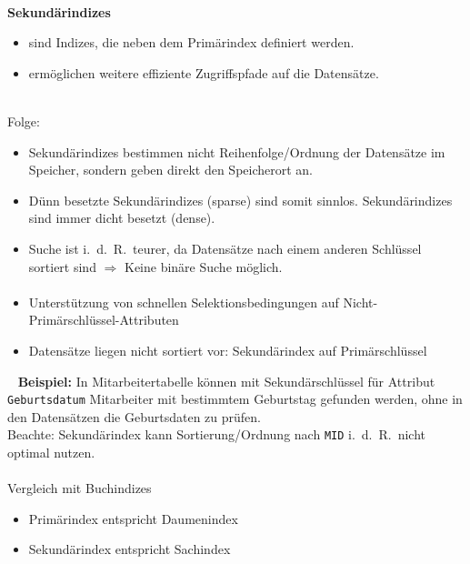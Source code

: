 \begin{frame}{\insertsection}
\framesubtitle{\insertsubsection}	
\abs
\textbf{Sekund\"arindizes}
\begin{itemize}
	\item sind Indizes, die neben dem Prim\"arindex definiert werden.\\[4pt] 
	\item erm\"oglichen weitere effiziente Zugriffspfade auf die Datens\"atze.
\end{itemize}
\pause
\ \\[4pt]
Folge:
\begin{itemize}
	\item Sekund\"arindizes bestimmen nicht Reihenfolge/Ordnung der Datens\"atze im Speicher, sondern geben direkt den Speicherort an.
	\item D\"unn besetzte Sekund\"arindizes (sparse) sind somit sinnlos. Sekund\"arindizes sind immer dicht besetzt (dense).
	\item Suche ist i.~d.~R.~teurer, da Datens\"atze nach einem anderen Schl\"ussel sortiert sind $\Rightarrow$ Keine bin\"are Suche m\"oglich.
\end{itemize}
\end{frame}

\begin{frame}{\insertsection}
\framesubtitle{\insertsubsection}	
\abs
{}
\begin{itemize}
\item Unterst\"utzung von schnellen Selektionsbedingungen auf Nicht-Prim\"arschl\"ussel-Attributen
\item Datens\"atze liegen nicht sortiert vor: Sekund\"arindex auf Prim\"arschl\"ussel
\end{itemize}
\pause
\abs\ \abs
\textbf{Beispiel:} In Mitarbeitertabelle k\"onnen mit Sekund\"arschl\"ussel für Attribut 
\texttt{Geburtsdatum} Mitarbeiter mit bestimmtem Geburtstag gefunden werden, ohne in den Datens\"atzen die 
Geburtsdaten zu pr\"ufen.
\\[4pt]
Beachte: Sekund\"arindex kann Sortierung/Ordnung nach \texttt{MID} i.~d.~R.~nicht optimal nutzen.
\end{frame}

\begin{frame}{\insertsection}
\framesubtitle{\insertsubsection}	
\abs
Vergleich mit Buchindizes
\begin{itemize}
	\item Prim\"arindex entspricht Daumenindex\\[8pt]
	\item Sekund\"arindex entspricht Sachindex
\end{itemize}
\end{frame}

